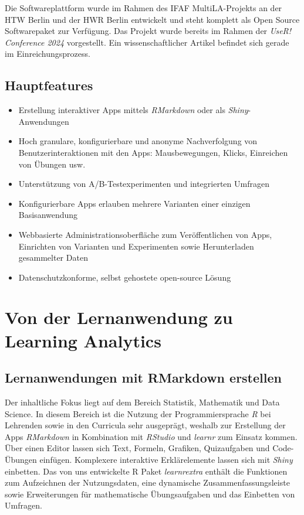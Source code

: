 \documentclass[a0,portrait]{a0poster}
\begin{document}
\begin{multicols}{2}
Die Softwareplattform wurde im Rahmen des IFAF MultiLA-Projekts an der HTW Berlin und der HWR Berlin entwickelt und steht komplett als Open Source Softwarepaket zur Verfügung. Das Projekt wurde bereits im Rahmen der \textit{UseR! Conference 2024} \cite{userconf24} vorgestellt. Ein wissenschaftlicher Artikel befindet sich gerade im Einreichungsprozess.

\subsection*{Hauptfeatures}

\begin{itemize}
    \item Erstellung interaktiver Apps mittels \textit{RMarkdown} oder als \textit{Shiny}-Anwendungen
    \item Hoch granulare, konfigurierbare und anonyme Nachverfolgung von Benutzerinteraktionen mit den Apps: Mausbewegungen, Klicks, Einreichen von Übungen usw.
    \item Unterstützung von A/B-Testexperimenten und integrierten Umfragen
    \item Konfigurierbare Apps erlauben mehrere Varianten einer einzigen Basisanwendung
    \item Webbasierte Administrationsoberfläche zum Veröffentlichen von Apps, Einrichten von Varianten und Experimenten sowie Herunterladen gesammelter Daten
    \item Datenschutzkonforme, selbst gehostete open-source Lösung
\end{itemize}

\section*{Von der Lernanwendung zu Learning Analytics}

\subsection*{Lernanwendungen mit RMarkdown erstellen}

Der inhaltliche Fokus liegt auf dem Bereich Statistik, Mathematik und Data Science. In diesem Bereich ist die Nutzung der Programmiersprache \textit{R} bei Lehrenden sowie in den Curricula sehr ausgeprägt, weshalb zur Erstellung der Apps \textit{RMarkdown} in Kombination mit \textit{RStudio} und \textit{learnr} \cite{aden-buie_learnr_2023} zum Einsatz kommen. Über einen Editor lassen sich Text, Formeln, Grafiken, Quizaufgaben und Code-Übungen einfügen. Komplexere interaktive Erklärelemente lassen sich mit \textit{Shiny} einbetten. Das von uns entwickelte R Paket \textit{learnrextra} \cite{konrad_ifafmultilalearnrextra_2024} enthält die Funktionen zum Aufzeichnen der Nutzungsdaten, eine dynamische Zusammenfassungsleiste sowie Erweiterungen für mathematische Übungsaufgaben und das Einbetten von Umfragen.


\end{multicols}
\end{document}
